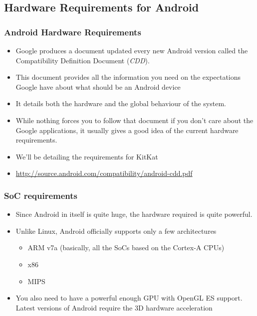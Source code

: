 \subsection{Hardware Requirements for Android}

\begin{frame}
  \frametitle{Android Hardware Requirements}
  \begin{itemize}
  \item Google produces a document updated every new Android version
    called the Compatibility Definition Document (\emph{CDD}).
  \item This document provides all the information you need on the
    expectations Google have about what should be an Android device
  \item It details both the hardware and the global behaviour of the
    system.
  \item While nothing forces you to follow that document if you don't
    care about the Google applications, it usually gives a good idea
    of the current hardware requirements.
  \item We'll be detailing the requirements for KitKat
  \item \url{http://source.android.com/compatibility/android-cdd.pdf}
  \end{itemize}
\end{frame}

\begin{frame}
  \frametitle{SoC requirements}
  \begin{itemize}
  \item Since Android in itself is quite huge, the hardware required
    is quite powerful.
  \item Unlike Linux, Android officially supports only a few
    architectures
    \begin{itemize}
    \item ARM v7a (basically, all the SoCs based on the Cortex-A CPUs)
    \item x86
    \item MIPS
    \end{itemize}
  \item You also need to have a powerful enough GPU with OpenGL ES
    support. Latest versions of Android require the 3D hardware
    acceleration
  \end{itemize}
\end{frame}

